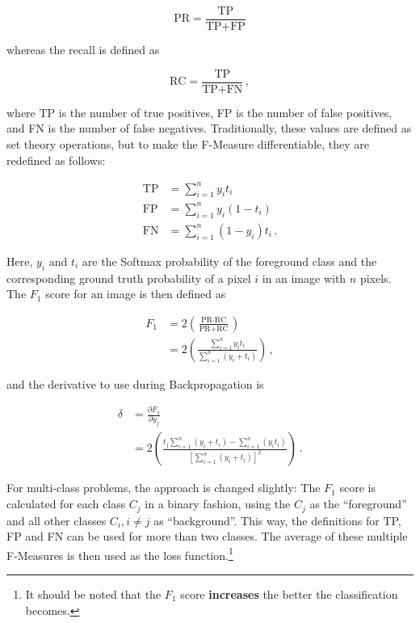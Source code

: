 \[ \text{PR} = \frac{\text{TP}}{\text{TP} + \text{FP}} \]

\noindent whereas the recall is defined as

\[ \text{RC} = \frac{\text{TP}}{\text{TP} + \text{FN}} \,, \]

\noindent where TP is the number of true positives, FP is the number of false positives, and FN is the number of false negatives. Traditionally, these values are defined as set theory operations, but to make the F-Measure differentiable, they are redefined as follows:

\begin {align}
\text{TP} &= \sum \limits_{i=1}^{n} y_i t_i \\
\text{FP} &= \sum  \limits_{i=1}^{n} y_i (1 - t_i) \\
\text{FN} &= \sum \limits_{i=1}^{n} (1 - y_i) t_i \,.
\end {align}

\noindent Here, $y_i$ and $t_i$ are the Softmax probability of the foreground class and the corresponding ground truth probability of a pixel $i$ in an image with $n$ pixels. The $F_1$ score for an image is then defined as

\begin {align}
 	F_1 &= 2 \left ( \frac{\text{PR} \cdot \text{RC}}{\text{PR} + \text{RC}} \right ) \\
		&= 2 \left ( \frac{\sum_{i=1}^{n} y_i t_i }{ \sum_{i=1}^{n} (y_i + t_i) } \right ) \,,
\end {align}

\noindent and the derivative to use during Backpropagation is

\begin {align}
	\delta &= \frac{\partial F_1}{\partial y_j}\\
	&= 2 \left ( \frac{t_j \sum_{i=1}^{n} \left ( y_i + t_i \right ) - \sum_{i=1}^{n} \left ( y_i t_i \right )  }{\left [ \sum_{i=1}^{n} \left ( y_i + t_i \right ) \right ]^2 } \right ) \,.
\end {align}

\noindent For multi-class problems, the approach is changed slightly: The $F_1$ score is calculated for each class $C_j$ in a binary fashion, using the $C_j$ as the ``foreground'' and all other classes $C_i, i \neq j$ as ``background''. This way, the definitions for TP, FP and FN can be used for more than two classes. The average of these multiple F-Measures is then used as the loss function.\footnote{It should be noted that the $F_1$ score \textbf{increases} the better the classification becomes.}

